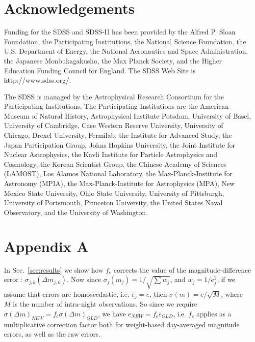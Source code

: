 \documentclass[fleqn,usenatbib]{mnras}  %
\begin{document}
\section*{Acknowledgements}

Funding for the SDSS and SDSS-II has been provided by the Alfred P. Sloan Foundation, the Participating Institutions, the National Science Foundation, the U.S. Department of Energy, the National Aeronautics and Space Administration, the Japanese Monbukagakusho, the Max Planck Society, and the Higher Education Funding Council for England. The SDSS Web Site is http://www.sdss.org/.

The SDSS is managed by the Astrophysical Research Consortium for the Participating Institutions. The Participating Institutions are the American Museum of Natural History, Astrophysical Institute Potsdam, University of Basel, University of Cambridge, Case Western Reserve University, University of Chicago, Drexel University, Fermilab, the Institute for Advanced Study, the Japan Participation Group, Johns Hopkins University, the Joint Institute for Nuclear Astrophysics, the Kavli Institute for Particle Astrophysics and Cosmology, the Korean Scientist Group, the Chinese Academy of Sciences (LAMOST), Los Alamos National Laboratory, the Max-Planck-Institute for Astronomy (MPIA), the Max-Planck-Institute for Astrophysics (MPA), New Mexico State University, Ohio State University, University of Pittsburgh, University of Portsmouth, Princeton University, the United States Naval Observatory, and the University of Washington. 


\section*{Appendix A}
In Sec.~\ref{sec:results} we show how $f_{c}$ corrects the value of the magnitude-difference error : $\sigma_{j,k}(\Delta m_{j,k})$. Now since $\sigma_{j}(m_{j}) = 1 / \sqrt{\sum{w_{j}}}$, and $w_{j} = 1 / e_{j}^{2}$, if we assume that errors are homoscedastic, i.e. $e_{j} = e$, then $\sigma(m) = e / \sqrt{M}$, where $M$ is the number of intra-night observations.  
So since we require $\sigma(\Delta m)_{NEW} = f_{c} \sigma(\Delta m)_{OLD}$, we have $e_{NEW} = f_{c} e_{OLD}$,  i.e. $f_{c}$ applies as a multiplicative correction factor both for weight-based day-averaged magnitude errors, as well as the raw errors. 







%



\bsp	%
\label{lastpage}
\end{document}
